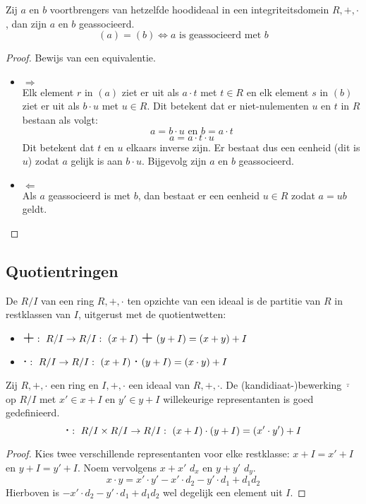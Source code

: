 \documentclass[main.tex]{subfiles}
\begin{document}
\begin{gev}
  Zij $a$ en $b$ voortbrengers van hetzelfde hoodideaal in een integriteitsdomein $R,+,\cdot$, dan zijn $a$ en $b$ geassocieerd.
  \[ (a) = (b) \Leftrightarrow a\text{ is geassocieerd met } b \]

  \begin{proof}
    Bewijs van een equivalentie.
    \begin{itemize}
    \item $\Rightarrow$\\
      Elk element $r$ in $(a)$ ziet er uit als $a \cdot t$ met $t\in R$ en elk element $s$ in $(b)$ ziet er uit als $b \cdot u$ met $u\in R$.
      Dit betekent dat er niet-nulementen $u$ en $t$ in $R$ bestaan als volgt:
      \[ a = b\cdot u \text{ en } b = a \cdot t \]
      \[ a = a \cdot t \cdot u \]
      Dit betekent dat $t$ en $u$ elkaars inverse zijn.
      Er bestaat dus een eenheid (dit is $u$) zodat $a$ gelijk is aan $b\cdot u$.
      Bijgevolg zijn $a$ en $b$ geassocieerd.      
    \item $\Leftarrow$\\
      Als $a$ geassocieerd is met $b$, dan bestaat er een eenheid $u\in R$ zodat $a = ub$ geldt.
    \end{itemize}
  \end{proof}
\end{gev}

\subsection{Quotientringen}
\label{sec:quotientringen}

\begin{de}
  De  $R/I$ van een ring $R,+,\cdot$ ten opzichte van een ideaal is de partitie van $R$ in restklassen van $I$, uitgerust met de quotientwetten:
  \begin{itemize}
  \item $\scalebox{1.5}{$+$}:\ R/I \rightarrow R/I:\ (x+I)\ \scalebox{1.5}{$+$}\ (y+I) = (x+y)+I$
  \item $\scalebox{1.5}{$\cdot$}:\ R/I \rightarrow R/I:\ (x+I)\ \scalebox{1.5}{$\cdot$}\ (y+I) = (x\cdot y) + I$
  \end{itemize}
\end{de}

\begin{pr}
  Zij $R,+,\cdot$ een ring en $I,+,\cdot$ een ideaal van $R,+,\cdot$.
  De (kandidiaat-)bewerking $\bar{\cdot}$ op $R/I$ met $x'\in x+I$ en $y'\in y+I$ willekeurige representanten is goed gedefinieerd.
  \[ \scalebox{1.5}{$\cdot$}:\ R/I \times R/I \rightarrow R/I:\ (x+I) \cdot (y+I) = (x'\cdot y') + I \]

  \begin{proof}
    Kies twee verschillende representanten voor elke restklasse: $x+I = x'+I$ en $y+I = y'+I$.
    Noem vervolgens $x+x'$ $d_{x}$ en $y+y'$ $d_{y}$.
    \[ x\cdot y = x'\cdot y' - x'\cdot d_{2} - y'\cdot d_{1} + d_{1}d_{2} \]
    Hierboven is $ - x'\cdot d_{2} - y'\cdot d_{1} + d_{1}d_{2}$ wel degelijk een element uit $I$.
  \end{proof}
\end{pr}
\end{document}
